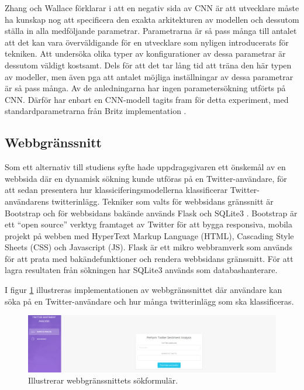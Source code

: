 \documentclass{kaumasters} %
\begin{document}
Zhang och Wallace förklarar i \cite{cnn:002} att en negativ sida av CNN är att utvecklare måste ha kunskap nog att specificera den exakta arkitekturen av modellen och dessutom ställa in alla medföljande parametrar. Parametrarna är så pass många till antalet att det kan vara överväldigande för en utvecklare som nyligen introducerats för tekniken. Att undersöka olika typer av konfigurationer av dessa parametrar är dessutom väldigt kostsamt. Dels för att det tar lång tid att träna den här typen av modeller, men även pga att antalet möjliga inställningar av dessa parametrar är så pass många. Av de anledningarna har ingen parametersökning utförts på CNN. Därför har enbart en CNN-modell tagits fram för detta experiment, med standardparametrarna från Britz implementation \cite{impcnn:002}.






\subsection{Webbgränssnitt}
Som ett alternativ till studiens syfte hade uppdragsgivaren ett önskemål av en webbsida där en dynamisk sökning kunde utföras på en Twitter-användare, för att sedan presentera hur klassiciferingsmodellerna klassificerar Twitter-användarens twitterinlägg.
Tekniker som valts för webbsidans gränssnitt är Bootstrap \cite{gui:001} och för webbsidans bakände används Flask \cite{gui:002} och SQLite3 \cite{gui:003}.
Bootstrap är ett “open source” verktyg framtaget av Twitter för att bygga responsiva, mobila projekt på webben med HyperText Markup Language (HTML), Cascading Style Sheets (CSS) och Javascript (JS). Flask är ett mikro webbramverk som används för att prata med bakändefunktioner och rendera webbsidans gränssnitt. För att lagra resultaten från sökningen har SQLite3 används som databashanterare.

I figur \ref{fig:gui_form} illustreras implementationen av webbgränssnittet där användare kan söka på en Twitter-användare och hur många twitterinlägg som ska klassificeras.

\begin{figure}[H]
\includegraphics[width=12cm]{GUI_form}
\centering
\caption{Illustrerar webbgränssnittets sökformulär.}
\label{fig:gui_form}
\end{figure}
\end{document}
